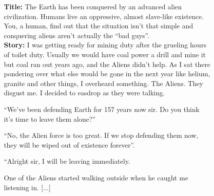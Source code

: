 \begin{figure}[htbp]
    \centering    

        \begin{tcolorbox}[colback=gray!10, colframe=black!75, title=Original story, width=\textwidth]
\textbf{Title:} The Earth has been conquered by an advanced alien civilization. Humans live an oppressive, almost slave-like existence. You, a human, find out that the situation isn't that simple and conquering aliens aren't actually the ``bad guys''. \\

\textbf{Story:} I was getting ready for mining duty after the grueling hours of toilet duty. Usually we would have coal power a drill and mine it but coal ran out years ago, and the Aliens didn't help. As I sat there pondering over what else would be gone in the next year like helium, granite and other things, I overheard something. The Aliens. They disgust me. I decided to easdrop as they were talking. 
 
 
 ``We've been defending Earth for 157 years now sir. Do you think it's time to leave them alone?'' 
 
 ``No, the Alien force is too great. If we stop defending them now, they will be wiped out of existence forever''. 
 
 ``Alright sir, I will be leaving immediately. 
 
 One of the Aliens started walking outside when he caught me listening in. [...]
 
 
 
 

\end{tcolorbox}
\end{figure}
